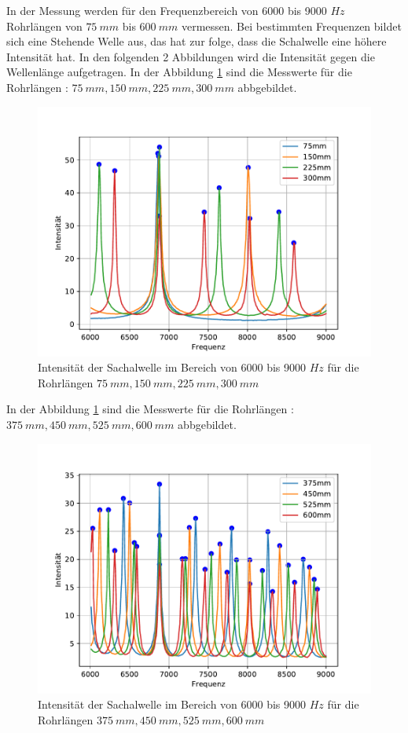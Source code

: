 In der Messung werden für den Frequenzbereich von 6000 bis 9000 $\si{Hz}$ Rohrlängen von $\SI{75}{mm}$ bis $\SI{600}{mm}$ vermessen.
Bei bestimmten Frequenzen bildet sich eine Stehende Welle aus, das hat zur folge, dass die Schalwelle eine höhere Intensität hat.
In den folgenden 2 Abbildungen wird die Intensität gegen die Wellenlänge aufgetragen.
In der Abbildung \ref{fig.1} sind die Messwerte für die Rohrlängen : $\SI{75}{mm}, \SI{150}{mm}, \SI{225}{mm}, \SI{300}{mm}$ abbgebildet.
\begin{figure}[h!]
  \centering
  \includegraphics[width=\textwidth]{1234.pdf}
  \caption{Intensität der Sachalwelle im Bereich von 6000 bis 9000 $\si{Hz}$ für die Rohrlängen $\SI{75}{mm}, \SI{150}{mm}, \SI{225}{mm}, \SI{300}{mm}$}
  \label{fig.1}
\end{figure}
In der Abbildung \ref{fig.1} sind die Messwerte für die Rohrlängen : $\SI{375}{mm}, \SI{450}{mm}, \SI{525}{mm}, \SI{600}{mm}$ abbgebildet.
\begin{figure}[h!]
  \centering
  \includegraphics[width=\textwidth]{5678.pdf}
  \caption{Intensität der Sachalwelle im Bereich von 6000 bis 9000 $\si{Hz}$ für die Rohrlängen $\SI{375}{mm}, \SI{450}{mm}, \SI{525}{mm}, \SI{600}{mm}$}
  \label{fig.2}
\end{figure}

